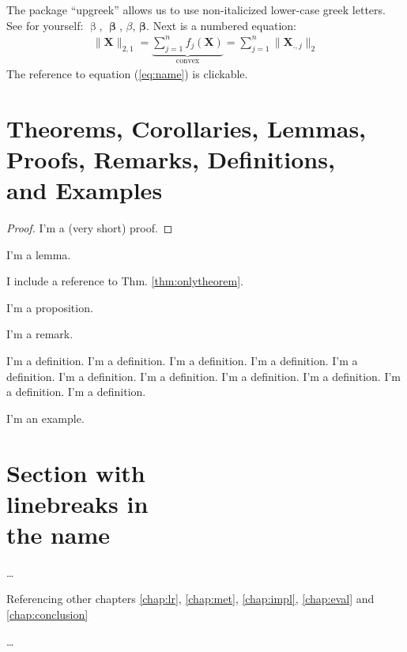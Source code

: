 The package ``upgreek'' allows us to use non-italicized lower-case greek letters. See for yourself: $\upbeta$, $\bm\upbeta$, $\beta$, $\bm\beta$. Next is a numbered equation:
\begin{align}
\label{eq:name}
\|\bm{X}\|_{2,1}={\underbrace{\sum_{j=1}^nf_j(\bm{X})}_{\text{convex}}}=\sum_{j=1}^n\|\bm{X}_{.,j}\|_2
\end{align}
The reference to equation (\ref{eq:name}) is clickable.

\section[Theorems, Corollaries, Lemmas, Proofs, Remarks, Definitions\\ and Examples]{Theorems, Corollaries, Lemmas,\\ Proofs, Remarks, Definitions,\\ and Examples}

\begin{theorem}
\label{thm:onlytheorem}
\blindtext
\end{theorem}

\begin{proof}
I'm a (very short) proof.
\end{proof}

\begin{lemma}
I'm a lemma.
\end{lemma}

\begin{corollary}
I include a reference to Thm. \ref{thm:onlytheorem}.
\end{corollary}

\begin{proposition}
I'm a proposition.
\end{proposition}

\begin{remark}
I'm a remark.
\end{remark}

\begin{definition}
I'm a definition. I'm a definition. I'm a definition. I'm a definition. I'm a definition. I'm a definition. I'm a definition. I'm a definition. I'm a definition. I'm a definition. I'm a definition.
\end{definition}

\begin{example}
I'm an example.
\end{example}


\section[Optional table of contents heading]{Section with\\ linebreaks in\\the
name}


\Blindtext[2]


\ldots

Referencing other chapters \ref{chap:lr}, \ref{chap:met}, \ref{chap:impl}, \ref{chap:eval} and \ref{chap:conclusion}

\ldots
